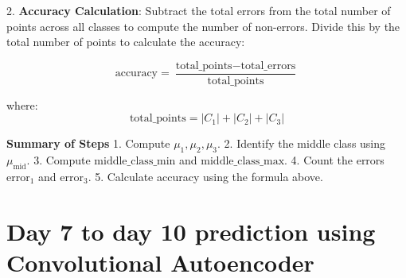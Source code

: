 2. \textbf{Accuracy Calculation}: Subtract the total errors from the total number of points across all classes to compute the number of non-errors. Divide this by the total number of points to calculate the accuracy:

\[
\text{accuracy} = \frac{\text{total\_points} - \text{total\_errors}}{\text{total\_points}}
\]

where:
\[
\text{total\_points} = |C_1| + |C_2| + |C_3|
\]

\textbf{Summary of Steps}
1. Compute \( \mu_1, \mu_2, \mu_3 \).
2. Identify the middle class using \( \mu_{\text{mid}} \).
3. Compute \( \text{middle\_class\_min} \) and \( \text{middle\_class\_max} \).
4. Count the errors \( \text{error}_1 \) and \( \text{error}_3 \).
5. Calculate accuracy using the formula above.

\section{Day 7 to day 10 prediction using Convolutional Autoencoder} \label{subsec:day7-to-day10}
